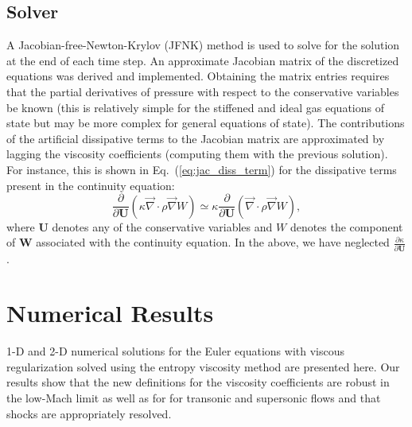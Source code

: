 \documentclass[review,10pt]{elsarticle}
\renewcommand{\div}{\vec{\nabla}\! \cdot \!}
\newcommand{\grad}{\vec{\nabla}}
\newcommand{\eqt}[1]{Eq.~(\ref{#1})}                     %
\begin{document}
\subsection{Solver} \label{sec:solver}
A Jacobian-free-Newton-Krylov (JFNK) method is used to solve for the solution at the end of each time step. 
An approximate Jacobian matrix of the discretized equations was derived and implemented. Obtaining the 
matrix entries requires that the partial derivatives of pressure with respect to the conservative variables 
be known (this is relatively simple for the stiffened and ideal gas equations of state but may be more 
complex for general equations of state). The contributions of the artificial dissipative terms to the 
Jacobian matrix are approximated by lagging the viscosity coefficients (computing them with the previous solution). 
For instance, this is shown in \eqt{eq:jac_diss_term} for the dissipative terms present in the continuity equation:
\begin{equation}
\label{eq:jac_diss_term}
\frac{\partial}{\partial \mathbf U} \left( \kappa \div \rho \grad W \right) \simeq \kappa \frac{\partial}{\partial \mathbf U} \left( \div \rho \grad W \right),
\end{equation}  
where $\mathbf  U$ denotes any of the conservative variables and $W$ denotes the component of $\mathbf  W$ associated with the 
continuity equation. In the above, we have neglected $\frac{\partial \kappa}{\partial \mathbf U}$.
%
\section{Numerical Results} \label{sec:results}

1-D and 2-D numerical solutions for the Euler equations with viscous regularization solved using the entropy 
viscosity method are presented here.
Our results show that the new definitions for the viscosity coefficients are robust in the low-Mach limit as well as for
for transonic and supersonic flows and that shocks are appropriately resolved. 
\end{document}
